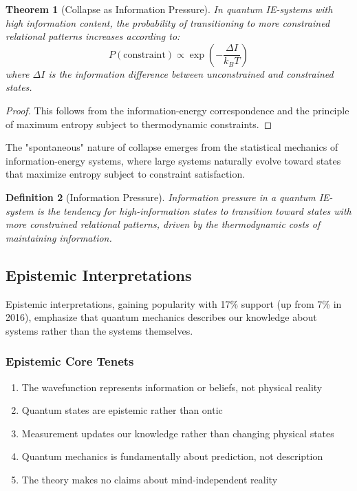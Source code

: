 \documentclass[12pt,a4paper]{article}
\newtheorem{theorem}{Theorem}[section]
\newtheorem{definition}[theorem]{Definition}
\begin{document}
\begin{theorem}[Collapse as Information Pressure]
In quantum IE-systems with high information content, the probability of transitioning to more constrained relational patterns increases according to:
\[
P(\text{constraint}) \propto \exp\left(-\frac{\Delta I}{k_B T}\right)
\]
where $\Delta I$ is the information difference between unconstrained and constrained states.
\end{theorem}

\begin{proof}
This follows from the information-energy correspondence and the principle of maximum entropy subject to thermodynamic constraints.
\end{proof}

The "spontaneous" nature of collapse emerges from the statistical mechanics of information-energy systems, where large systems naturally evolve toward states that maximize entropy subject to constraint satisfaction.

\begin{definition}[Information Pressure]
Information pressure in a quantum IE-system is the tendency for high-information states to transition toward states with more constrained relational patterns, driven by the thermodynamic costs of maintaining information.
\end{definition}

\subsection{Epistemic Interpretations}

Epistemic interpretations, gaining popularity with 17\% support (up from 7\% in 2016), emphasize that quantum mechanics describes our knowledge about systems rather than the systems themselves.

\subsubsection{Epistemic Core Tenets}
\begin{enumerate}
\item The wavefunction represents information or beliefs, not physical reality
\item Quantum states are epistemic rather than ontic
\item Measurement updates our knowledge rather than changing physical states
\item Quantum mechanics is fundamentally about prediction, not description
\item The theory makes no claims about mind-independent reality
\end{enumerate}
\end{document}
